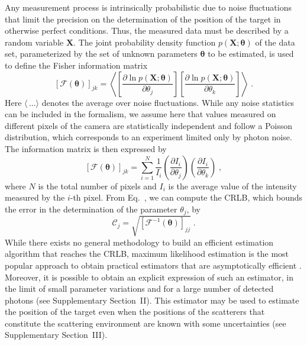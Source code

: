 \documentclass[aps,prl,twocolumn,amsmath,amssymb,superscriptaddress,10pt,nobibnotes]{revtex4-2}
\makeatletter
\renewcommand{\eqref}[1]{\textup{\tagform@{\ref*{#1}}}}
\renewcommand{\bm}[1]{\boldsymbol{\mathbf{#1}}}
\newcommand{\eq}[1]{Eq.~\eqref{#1}}
\makeatother
\begin{document}
Any measurement process is intrinsically probabilistic due to noise fluctuations that limit the precision on the determination of the position of the target in otherwise perfect conditions. Thus, the measured data must be described by a random variable $\bm{X}$. The joint probability density function $p(\bm{X} ; \bm{\theta})$ of the data set, parameterized by the set of unknown parameters $\bm{\theta}$ to be estimated, is used to define the Fisher information matrix~\cite{kay_fundamentals_1993}
\begin{equation}
\left[ \bm{\mathcal{F}}(\bm{\theta})\right]_{jk} = \left \langle \left[ \frac{\partial \ln p(\bm{X} ; \bm{\theta})}{\partial \theta_j} \right] \left[ \frac{\partial \ln p(\bm{X} ; \bm{\theta})}{\partial \theta_k} \right] \right \rangle \; .
\end{equation}
Here $\langle \, \dots \rangle $ denotes the average over noise fluctuations. While any noise statistics can be included in the formalism, we assume here that values measured on different pixels of the camera are statistically independent and follow a Poisson distribution, which corresponds to an experiment limited only by photon noise. The information matrix is then expressed by 
\begin{equation}
\left[ \bm{\mathcal{F}}(\bm{\theta})\right]_{jk} = \sum_{i=1}^{N} \frac{1}{I_i} \left( \frac{\partial I_i}{\partial \theta_j} \right) \left( \frac{\partial I_i}{\partial \theta_k} \right) \; ,
\label{eq_information_poisson}
\end{equation}
where $N$ is the total number of pixels and $I_i$ is the average value of the intensity measured by the $i$-th pixel. From \eq{eq_information_poisson}, we can compute the CRLB, which bounds the error in the determination of the parameter $\theta_j$, by
\begin{equation}
\mathcal{C}_{j}=\sqrt{\left[ \bm{\mathcal{F}}^{-1}(\bm{\theta})\right]_{jj}} \; .
\end{equation}
While there exists no general methodology to build an efficient estimation algorithm that reaches the CRLB, maximum likelihood estimation is the most popular approach to obtain practical estimators that are asymptotically efficient \cite{kay_fundamentals_1993}. Moreover, it is possible to obtain an explicit expression of such an estimator, in the limit of small parameter variations and for a large number of detected photons (see Supplementary Section~II). This estimator may be used to estimate the position of the target even when the positions of the
scatterers that constitute the scattering environment are known with some uncertainties (see Supplementary Section~III).
\end{document}
